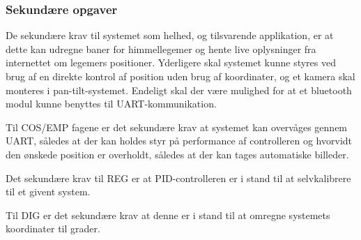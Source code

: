 \subsubsection{Sekundære opgaver}

De sekundære krav til systemet som helhed, og tilsvarende applikation, er at dette kan udregne baner for himmellegemer og hente live oplysninger fra internettet om legemers positioner. Yderligere skal systemet kunne styres ved brug af en direkte kontrol af position uden brug af koordinater, og et kamera skal monteres i pan-tilt-systemet. Endeligt skal der være mulighed for at et bluetooth modul kunne benyttes til UART-kommunikation.

Til COS/EMP fagene er det sekundære krav at systemet kan overvåges gennem UART, således at der kan holdes styr på performance af controlleren og hvorvidt den ønskede position er overholdt, således at der kan tages automatiske billeder.

Det sekundære krav til REG er at PID-controlleren er i stand til at selvkalibrere til et givent system.

Til DIG er det sekundære krav at denne er i stand til at omregne systemets koordinater til grader.